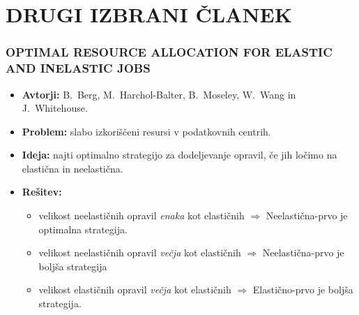 \documentclass[a4paper, 12pt]{beamer}
\newcommand{\myitem}{\item[\textbullet]}
\theoremstyle{definition}
\theoremstyle{plain}
\begin{document}
\section{DRUGI IZBRANI ČLANEK}
\begin{frame}
\frametitle{\small{OPTIMAL RESOURCE ALLOCATION FOR ELASTIC AND INELASTIC JOBS}}
    
    \begin{itemize}
        \item \textbf{Avtorji:} B.~Berg, M.~Harchol-Balter, B.~Moseley, W.~Wang in J.~Whitehouse.
        \item \textbf{Problem:} slabo izkoriščeni resursi v podatkovnih centrih.
        \item \textbf{Ideja:} najti optimalno strategijo za dodeljevanje opravil, če jih ločimo na elastična in neelastična.
        \item \textbf{Rešitev:} 
            \begin{itemize}
                \myitem velikost neelastičnih opravil \textit{enaka} kot elastičnih $\Rightarrow$ Neelastična-prvo je optimalna strategija.
                \myitem velikost neelastičnih opravil \textit{večja} kot elastičnih $\Rightarrow$ Neelastična-prvo je boljša strategija
                \myitem velikost elastičnih opravil \textit{večja} kot elastičnih $\Rightarrow$ Elastično-prvo je boljša strategija.
            \end{itemize}
    \end{itemize}

\end{frame}


\end{document}
